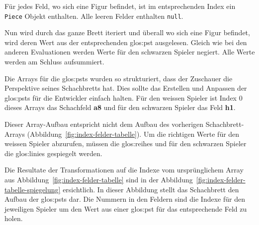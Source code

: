 Für jedes Feld, wo sich eine Figur befindet, ist im entsprechenden Index ein \texttt{Piece} Objekt enthalten.
Alle leeren Felder enthalten \texttt{null}.



Nun wird durch das ganze Brett iteriert und überall wo sich eine Figur befindet, wird deren Wert aus der entsprechenden \gls{glos:pst} ausgelesen.
Gleich wie bei den anderen Evaluationen werden Werte für den schwarzen Spieler negiert.
Alle Werte werden am Schluss aufsummiert.

Die Arrays für die \glspl{glos:pst} wurden so strukturiert, dass der Zuschauer die Perspektive seines Schachbretts hat.
Dies sollte das Erstellen und Anpassen der \glspl{glos:pst} für die Entwickler einfach halten.
Für den weissen Spieler ist Index 0 dieses Arrays das Schachfeld \textbf{a8} und für den schwarzen Spieler das Feld \textbf{h1}.



\newpage

Dieser Array-Aufbau entspricht nicht dem Aufbau des vorherigen Schachbrett-Arrays (Abbildung~\ref{fig:index-felder-tabelle}).
Um die richtigen Werte für den weissen Spieler abzurufen, müssen die \glspl{glos:reihe} und für den schwarzen Spieler die \glspl{glos:linie} gespiegelt werden.



Die Resultate der Transformationen auf die Indexe vom ursprünglichem Array aus Abbildung~\ref{fig:index-felder-tabelle} sind in der Abbildung~\ref{fig:index-felder-tabelle-spiegelung} ersichtlich.
In dieser Abbildung stellt das Schachbrett den Aufbau der \glspl{glos:pst} dar.
Die Nummern in den Feldern sind die Indexe für den jeweiligen Spieler um den Wert aus einer \gls{glos:pst} für das entsprechende Feld zu holen.

